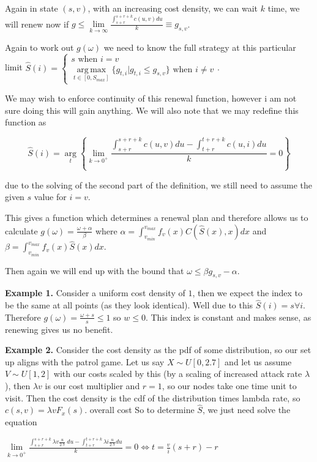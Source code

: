 \documentclass[a4paper,10pt]{article}
\theoremstyle{definition}
\theoremstyle{definition}
\theoremstyle{remark}
\theoremstyle{definition}
\DeclareMathOperator*{\argmax}{arg\,max}
\begin{document}
Again in state $(s,v)$, with an increasing cost density, we can wait $k$ time, we will renew now if $g \leq \lim\limits_{k \rightarrow \infty} \frac{\int_{s+r}^{s+r+k} c(u,v) du}{k} \equiv g_{s,v}$.

Again to work out $g(\omega)$ we need to know the full strategy at this particular limit $\hat{S}(i)= \begin{cases}
s \text{ when } i=v \\
\argmax\limits_{t \in [0,S_{max}]} \{g_{t,i} | g_{t,i} \leq g_{s,v} \} \text{ when } i \neq v
\end{cases}$.

We may wish to enforce continuity of this renewal function, however i am not sure doing this will gain anything. We will also note that we may redefine this function as

$$\hat{S}(i)=\arg\limits_{t} \left\{\lim\limits_{k \rightarrow 0^{+}} \frac{\int_{s+r}^{s+r+k} c(u,v) du - \int_{t+r}^{t+r+k} c(u,i) du}{k} =0  \right\}$$

due to the solving of the second part of the definition, we still need to assume the given $s$ value for $i=v$.

This gives a function which determines a renewal plan and therefore allows us to calculate $g(\omega)=\frac{\omega + \alpha}{\beta}$ where $\alpha= \int_{v_{min}}^{v_{max}} f_{v}(x)C(\hat{S}(x),x) dx$ and $\beta=\int_{v_{min}}^{v_{max}} f_{v}(x)\hat{S}(x) dx$.

Then again we will end up with the bound that $\omega \leq \beta g_{s,v} - \alpha$.


\textbf{Example 1.}
Consider a uniform cost density of $1$, then we expect the index to be the same at all points (as they look identical). Well due to this $\hat{S}(i) = s \forall i$. Therefore $g(\omega)=\frac{\omega + s}{s} \leq 1$ so $w \leq 0$. This index is constant and makes sense, as renewing gives us no benefit.


\textbf{Example 2.}
Consider the cost density as the pdf of some distribution, so our set up aligns with the patrol game. Let us say $X \sim U[0,2.7]$ and let us assume $V \sim U[1,2]$ with our costs scaled by this (by a scaling of increased attack rate $\lambda$), then $\lambda v$ is our cost multiplier and $r=1$, so our nodes take one time unit to visit. Then the cost density is the cdf of the distribution times lambda rate, so $c(s,v)= \lambda v F_{x}(s)$. overall cost So to determine $\hat{S}$, we just need solve the equation

$\lim\limits_{k \rightarrow 0^{+}} \frac{\int_{s+r}^{s+r+k} \lambda v \frac{u}{2.7} \ du - \int_{t+r}^{t+r+k} \lambda i \frac{u}{2.7} du}{k} =0 \iff t=\frac{v}{i} (s+r) -r$
 
\end{document}
